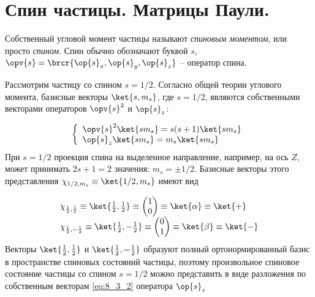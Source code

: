 \section{Спин частицы. Матрицы Паули.}

Собственный угловой момент частицы называют {\em спиновым моментом}, или просто {\em спином}. Спин обычно обозначают буквой $s$, $\opv{s} = \brcr{\op{s}_x, \op{s}_y, \op{s}_z}$ -- оператор спина.

Рассмотрим частицу со спином $s = 1/2$. Согласно общей теории углового момента, базисные векторы $\ket{s, m_s}$, где $s = 1/2$, являются собственными векторами операторов $\opv{s}^2$ и $\op{s}_z$:

\begin{equation}
\label{eq:8_3_1}
\left\{
\begin{array}{l}
\opv{s}^2 \ket{s m_s} = s(s+1) \ket{s m_s}\\
\op{s}_z \ket{s m_s} = m_s \ket{s m_s}
\end{array}
\right.
\end{equation}%
%
При $s=1/2$ проекция спина на выделенное направление, например, на ось $Z$, может принимать $2s + 1 = 2$ значения: $m_s = \pm 1/2$. Базисные векторы этого представления $\chi_{1/2, m_s} \equiv \ket{1/2, m_s}$ имеют вид

\begin{equation}
\label{eq:8_3_2}
  \begin{array}{l}
  \chi_{\frac{1}{2}, \frac{1}{2}} \equiv \ket{\frac{1}{2}, \frac{1}{2}} \equiv \begin{pmatrix} 1 \\ 0 \end{pmatrix}    \equiv \ket{\alpha} \equiv \ket{+}\\
  \chi_{\frac{1}{2}, -\frac{1}{2}} \equiv \ket{\frac{1}{2}, -\frac{1}{2}} \equiv \begin{pmatrix} 0 \\ 1 \end{pmatrix}   \equiv \ket{\beta} \equiv \ket{-}
\end{array}
\end{equation}%
%
Векторы $\ket{\frac{1}{2}, \frac{1}{2}}$ и $\ket{\frac{1}{2}, -\frac{1}{2}}$ образуют полный ортонормированный базис в пространстве спиновых состояний частицы, поэтому произвольное спиновое состояние частицы со спином $s=1/2$ можно представить в виде разложения по собственным векторам \eqref{eq:8_3_2} оператора $\op{s}_z$

